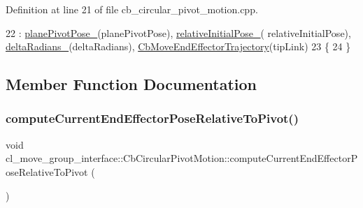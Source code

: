 Definition at line 21 of file cb\+\_\+circular\+\_\+pivot\+\_\+motion.\+cpp.


\begin{DoxyCode}
22         : \hyperlink{classcl__move__group__interface_1_1CbCircularPivotMotion_a0994efbe93b9f9a61fcf3703c360cda2}{planePivotPose\_}(planePivotPose), \hyperlink{classcl__move__group__interface_1_1CbCircularPivotMotion_a1b2cc65d2f27a4dec54c20f1f00d4bb8}{relativeInitialPose\_}(
      relativeInitialPose), \hyperlink{classcl__move__group__interface_1_1CbCircularPivotMotion_afade33f1182615c64ea972075bfd2b95}{deltaRadians\_}(deltaRadians), 
      \hyperlink{classcl__move__group__interface_1_1CbMoveEndEffectorTrajectory_af7e718b0c53e912fd74968abbb0a4810}{CbMoveEndEffectorTrajectory}(tipLink)
23     \{
24     \}
\end{DoxyCode}


\subsection{Member Function Documentation}
\mbox{\label{classcl__move__group__interface_1_1CbCircularPivotMotion_a147d7113ed686709dc2d362e56a95ad9}} 
\subsubsection{\texorpdfstring{compute\+Current\+End\+Effector\+Pose\+Relative\+To\+Pivot()}{computeCurrentEndEffectorPoseRelativeToPivot()}}
{\footnotesize\ttfamily void cl\+\_\+move\+\_\+group\+\_\+interface\+::\+Cb\+Circular\+Pivot\+Motion\+::compute\+Current\+End\+Effector\+Pose\+Relative\+To\+Pivot (\begin{DoxyParamCaption}{ }\end{DoxyParamCaption})\hspace{0.3cm}{\ttfamily [private]}}



